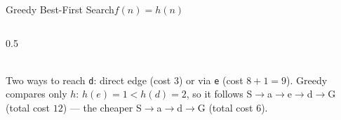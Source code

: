 \documentclass[aspectratio=169,11pt]{beamer}
\begin{document}
\begin{frame}{Greedy Best-First Search}{$f(n) = h(n)$}
\begin{columns}[T]
\begin{column}{0.5\textwidth}
\begin{center}
{}\\
      \scriptsize Two ways to reach \texttt{d}: direct edge (cost 3) or via \texttt{e} (cost $8{+}1{=}9$).
      Greedy compares only $h$: $h(e){=}1 < h(d){=}2$, so it follows
      S$\to$a$\to$e$\to$d$\to$G (total cost $12$) —  the
      cheaper S$\to$a$\to$d$\to$G (total cost $6$).
      \end{center}
    \end{column}
  \end{columns}
\end{frame}
\end{document}
